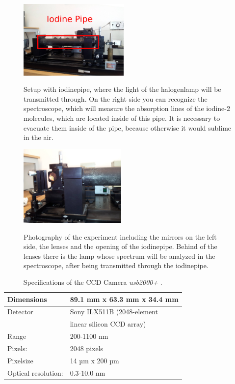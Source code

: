 \begin{figure}
    \caption{Setup with iodinepipe, where the light of the
        halogenlamp will be transmitted through. On the right side
        you can recognize the spectroscope, which will measure
        the absorption lines of the iodine-2 molecules, which
        are located inside of this pipe. It is necessary
        to evacuate them inside of the pipe, because otherwise it
        would sublime in the air.
        } 
    \includegraphics[width=0.48\textwidth]{pics/const2}
 \label{fig:const2}
\end{figure}

\begin{figure}
\caption{Photography of the experiment including the mirrors on
    the left side, the lenses and the opening of the iodinepipe.
    Behind of the lenses there is the lamp whose spectrum will
    be analyzed in the spectroscope, after being transmitted
    through the iodinepipe.} 
\includegraphics[width=0.47\textwidth]{pics/const4}
 \label{fig:const4}

\end{figure}

\begin{table}
    \caption{Specifications of the  CCD Camera \textit{usb2000+}
        \cite{usb2000_site}.}
\begin{tabular}{| l | l |}
    \hline
    Dimensions & 89.1 mm x 63.3 mm x 34.4 mm \\ 
    \hline
    Detector & Sony ILX511B (2048-element \\
             & linear silicon CCD array) \\  
    \hline
    Range & 200-1100 nm \\ 
    \hline
    Pixels: & 2048 pixels \\ 
    \hline
    Pixelsize & 14 µm x 200 µm \\ 
    \hline
    Optical resolution: & 0.3-10.0 nm \\ 
    \hline
\end{tabular}
\label{tab:ccd}
\end{table}

